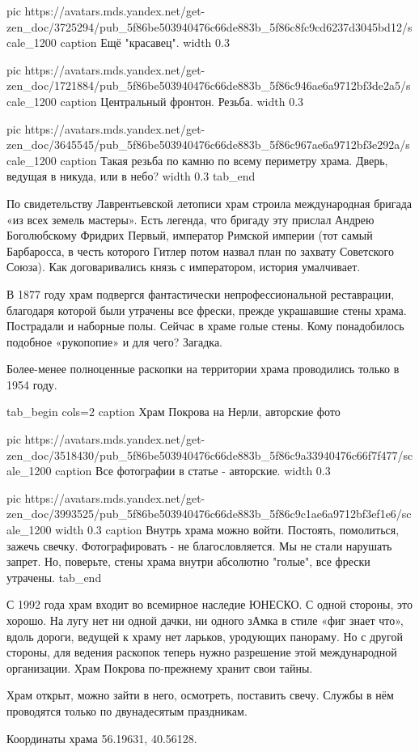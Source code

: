   pic https://avatars.mds.yandex.net/get-zen_doc/3725294/pub_5f86be503940476c66de883b_5f86c8fc9cd6237d3045bd12/scale_1200
  caption Ещё "красавец". 
  width 0.3

  pic https://avatars.mds.yandex.net/get-zen_doc/1721884/pub_5f86be503940476c66de883b_5f86c946ae6a9712bf3de2a5/scale_1200
  caption Центральный фронтон. Резьба.
  width 0.3

  pic https://avatars.mds.yandex.net/get-zen_doc/3645545/pub_5f86be503940476c66de883b_5f86c967ae6a9712bf3e292a/scale_1200
  caption Такая резьба по камню по всему периметру храма. Дверь, ведущая в никуда, или в небо?
  width 0.3
tab_end
\fi

По свидетельству Лаврентьевской летописи храм строила международная бригада «из
всех земель мастеры». Есть легенда, что бригаду эту прислал Андрею Боголюбскому
Фридрих Первый, император Римской империи (тот самый Барбаросса, в честь
которого Гитлер потом назвал план по захвату Советского Союза). Как
договаривались князь с императором, история умалчивает.

В 1877 году храм подвергся фантастически непрофессиональной реставрации,
благодаря которой были утрачены все фрески, прежде украшавшие стены храма.
Пострадали и наборные полы. Сейчас в храме голые стены. Кому понадобилось
подобное «рукопопие» и для чего? Загадка.

Более-менее полноценные раскопки на территории храма проводились только в 1954
году.

        
\ifcmt
tab_begin cols=2
  caption Храм Покрова на Нерли, авторские фото

  pic https://avatars.mds.yandex.net/get-zen_doc/3518430/pub_5f86be503940476c66de883b_5f86c9a33940476c66f7f477/scale_1200
  caption Все фотографии в статье - авторские.
  width 0.3

  pic https://avatars.mds.yandex.net/get-zen_doc/3993525/pub_5f86be503940476c66de883b_5f86c9c1ae6a9712bf3ef1e6/scale_1200
  width 0.3
  caption Внутрь храма можно войти. Постоять, помолиться, зажечь свечку. Фотографировать - не благословляется. Мы не стали нарушать запрет. Но, поверьте, стены храма внутри абсолютно "голые", все фрески утрачены. 
tab_end
\fi

С 1992 года храм входит во всемирное наследие ЮНЕСКО. С одной стороны, это
хорошо. На лугу нет ни одной дачки, ни одного зАмка в стиле «фиг знает что»,
вдоль дороги, ведущей к храму нет ларьков, уродующих панораму. Но с другой
стороны, для ведения раскопок теперь нужно разрешение этой международной
организации. Храм Покрова по-прежнему хранит свои тайны.

Храм открыт, можно зайти в него, осмотреть, поставить свечу. Службы в нём
проводятся только по двунадесятым праздникам.

Координаты храма 56.19631, 40.56128.

